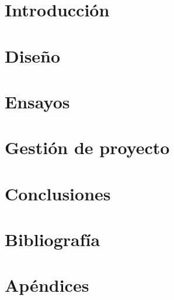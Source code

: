 \documentclass[12pt,oneside,final]{rf2}
\begin{document}





\newpage
{}

\tableofcontents

\listoffigures

\listoftables
\newpage



\startarabicpagination
\part{Introducción}


\part{Diseño}




\part{Ensayos}


\part{Gestión de proyecto}



\part{Conclusiones}


\part{Bibliografía}



\part{Apéndices}
\appendix





\end{document}
